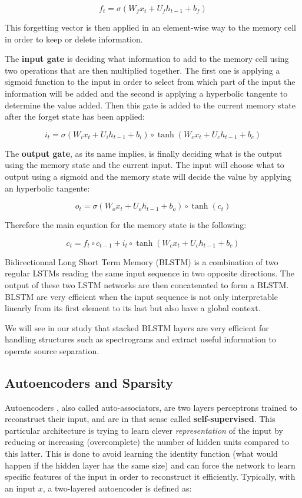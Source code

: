 \documentclass[master,final,11pt]{iscs-thesis}
\begin{document}
\[f_t = \sigma(W_{f} x_t + U_{f} h_{t-1} + b_f)\]

This forgetting vector is then applied in an element-wise way to the memory cell in order to keep or delete information.

The \textbf{input gate} is deciding what information to add to the memory cell using two operations that are then multiplied together. The first one is applying a sigmoid function to the input in order to select from which part of the input the information will be added and the second is applying a hyperbolic tangente to determine the value added. Then this gate is added to the current memory state after the forget state has been applied:

\[i_t = \sigma(W_{i} x_t + U_{i} h_{t-1} + b_i) \circ \tanh(W_{c} x_t + U_{c} h_{t-1} + b_c)\]

The \textbf{output gate}, as its name implies, is finally deciding what is the output using the memory state and the current input. The input will choose what to output using a sigmoid and the memory state will decide the value by applying an hyperbolic tangente:

\[o_t = \sigma(W_{o} x_t + U_{o} h_{t-1} + b_o) \circ \tanh(c_t)\]

Therefore the main equation for the memory state is the following:

\[c_t = f_t \circ c_{t-1} + i_t \circ \tanh(W_{c} x_t + U_{c} h_{t-1} + b_c)\]

Bidirectionnal Long Short Term Memory (BLSTM) is a combination of two regular LSTMs reading the same input sequence in two opposite directions. The output of these two LSTM networks are then concatenated to form a BLSTM. BLSTM are very efficient when the input sequence is not only interpretable linearly from its first element to its last but also have a global context.

We will see in our study that stacked BLSTM layers are very efficient for handling structures such as spectrograms and extract useful information to operate source separation.

\subsection{Autoencoders and Sparsity}

Autoencoders \cite{AE}, also called auto-associators, are two layers perceptrons trained to reconstruct their input, and are in that sense called \textbf{self-supervised}. This particular architecture is trying to learn clever \textit{representation} of the input by reducing or increasing (overcomplete) the number of hidden units compared to this latter. This is done to avoid learning the identity function (what would happen if the hidden layer has the same size) and can force the network to learn specific features of the input in order to reconstruct it efficiently. Typically, with an input $x$, a two-layered autoencoder is defined as:
\end{document}
